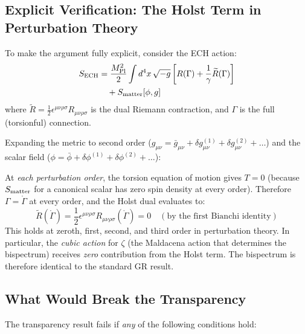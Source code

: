 \documentclass[aps,prd,twocolumn,superscriptaddress,showpacs,preprintnumbers,nofootinbib,longbibliography,floatfix]{revtex4-2}
\newcommand{\MPl}{M_{\rm Pl}}
\begin{document}
\subsection{Explicit Verification: The Holst Term in Perturbation Theory}

To make the argument fully explicit, consider the ECH action:
\begin{align}
S_{\rm ECH} &= \frac{\MPl^2}{2}\int d^4x\, \sqrt{-g}\left[R(\Gamma) + \frac{1}{\gamma}\widetilde{R}(\Gamma)\right]\nonumber\\
&\quad + S_{\rm matter}[\phi, g]
\end{align}
where $\widetilde{R} = \frac{1}{2}\epsilon^{\mu\nu\rho\sigma}R_{\mu\nu\rho\sigma}$ is the dual Riemann contraction, and $\Gamma$ is the full (torsionful) connection.

Expanding the metric to second order ($g_{\mu\nu} = \bar{g}_{\mu\nu} + \delta g^{(1)}_{\mu\nu} + \delta g^{(2)}_{\mu\nu} + \ldots$) and the scalar field ($\phi = \bar{\phi} + \delta\phi^{(1)} + \delta\phi^{(2)} + \ldots$):

At \emph{each perturbation order}, the torsion equation of motion gives $T = 0$ (because $S_{\rm matter}$ for a canonical scalar has zero spin density at every order). Therefore $\Gamma = \mathring{\Gamma}$ at every order, and the Holst dual evaluates to:
\begin{equation}
\widetilde{R}(\mathring{\Gamma}) = \frac{1}{2}\epsilon^{\mu\nu\rho\sigma}R_{\mu\nu\rho\sigma}(\mathring{\Gamma}) = 0 \quad (\text{by the first Bianchi identity})
\end{equation}
This holds at zeroth, first, second, and third order in perturbation theory. In particular, the \emph{cubic action} for $\zeta$ (the Maldacena action that determines the bispectrum) receives \emph{zero} contribution from the Holst term. The bispectrum is therefore identical to the standard GR result.

\subsection{What Would Break the Transparency}

The transparency result fails if \emph{any} of the following conditions hold:
\end{document}
